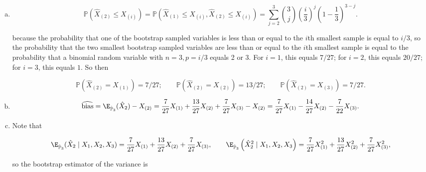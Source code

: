 \begin{solution}

\begin{enumerate}[(a)]

\item 

\[
\mathbb{P}(\hat{X}_{(2)} \leq X_{(i)}) =  \mathbb{P}(\hat{X}_{(1)} \leq X_{(i)}, \hat{X}_{(2)} \leq X_{(i)}) = \sum_{j=2}^3 \binom{3}{j}  \left( \frac{i}{3}\right)^j \left(1 - \frac{1}{3} \right)^{3-j}.
\]

because the probability that one of the bootstrap sampled variables is less than or equal to the \(i\)th smallest sample is equal to \(i/3\), so the probability that the two smallest bootstrap sampled variables are less than or equal to the \(i\)th smallest sample is equal to the probability that a binomial random variable with \(n = 3, p = i/3\) equals 2 or 3. For \(i=1\), this equals \(7/27\); for \(i=2\), this equals \(20/27\); for \(i=3\), this equals \(1\). So then

\[
\mathbb{P}(\hat{X}_{(2)} = X_{(1)}) = 7/27; \qquad  \mathbb{P}(\hat{X}_{(2)} = X_{(2)}) = 13/27;  \qquad  \mathbb{P}(\hat{X}_{(2)} = X_{(3)}) = 7/27.
\]

\item

\[
\widehat{\operatorname{bias}} = \E_{\hat{\mathbb{P}}_3}( \hat{X}_2) - X_{(2)} = \frac{7}{27} X_{(1)} + \frac{13}{27} X_{(2)} + \frac{7}{27} X_{(3)} - X_{(2)} = \frac{7}{27} X_{(1)} - \frac{14}{27} X_{(2)} - \frac{7}{22} X_{(3)}.
\]

\item

Note that

\[
\E_{\hat{\mathbb{P}}_3 }( \hat{X}_2  \mid X_1, X_2, X_3) = \frac{7}{27} X_{(1)} + \frac{13}{27} X_{(2)} + \frac{7}{27} X_{(3)} ,  \qquad \E_{\hat{\mathbb{P}}_3} \left( \hat{X}_2^2  \mid X_1, X_2, X_3 \right) = \frac{7}{27} X_{(1)}^2 + \frac{13}{27} X_{(2)}^2 + \frac{7}{27} X_{(3)}^2,
\]

so the bootstrap estimator of the variance is 


\end{enumerate}
\end{solution}
